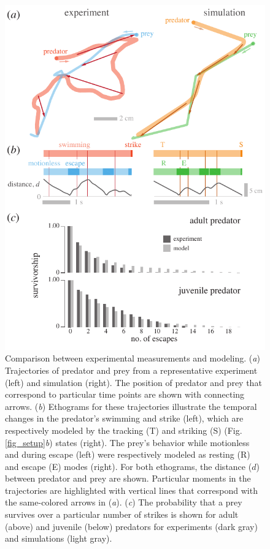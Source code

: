 \documentclass[]{rsos}%
\begin{document}
\begin{figure}[!h]
\centering
	\includegraphics[width=4.5in]{fig_trajectories}
\caption{
Comparison between experimental measurements and modeling. 
(\textit{a}) Trajectories of predator and prey from a representative experiment (left) and simulation (right). 
The position of predator and prey that correspond to particular time points are shown with connecting arrows.
(\textit{b}) Ethograms for these trajectories illustrate the temporal changes in the predator's swimming and strike (left), which are respectively modeled by the tracking (T) and striking (S) (Fig. \ref{fig_setup}\textit{b}) states (right). 
The prey's behavior while motionless and during escape (left) were respectively modeled as resting (R) and escape (E) modes (right).
For both ethograms, the distance ($d$) between predator and prey are shown.
Particular moments in the trajectories are highlighted with vertical lines that correspond with the same-colored arrows in (\textit{a}).
(\textit{c}) The probability that a prey survives over a particular number of strikes is shown for adult (above) and juvenile (below) predators for experiments (dark gray) and simulations (light gray).   
}
\label{fig_traj}
\end{figure}
\end{document}
